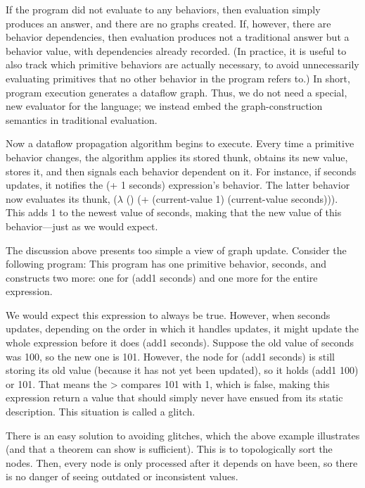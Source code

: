 If the program did not evaluate to any behaviors, then evaluation simply
produces an answer, and there are no graphs created. If, however, there are
behavior dependencies, then evaluation produces not a traditional answer but a
behavior value, with dependencies already recorded. (In practice, it is useful
to also track which primitive behaviors are actually necessary, to avoid
unnecessarily evaluating primitives that no other behavior in the program refers
to.) In short, program execution generates a dataflow graph. Thus, we do not
need a special, new evaluator for the language; we instead embed the
graph-construction semantics in traditional evaluation.

Now a dataflow propagation algorithm begins to execute. Every time a primitive
behavior changes, the algorithm applies its stored thunk, obtains its new value,
stores it, and then signals each behavior dependent on it. For instance, if
seconds updates, it notifies the (+ 1 seconds) expression’s behavior. The latter
behavior now evaluates its thunk, ($\lambda$ () (+ (current-value 1)
(current-value seconds))). This adds 1 to the newest value of seconds, making
that the new value of this behavior—just as we would expect.


The discussion above presents too simple a view of graph update. Consider the
following program:
This program has one primitive behavior, seconds, and constructs two more: one
for (add1 seconds) and one more for the entire expression.

We would expect this expression to always be true. However, when seconds
updates, depending on the order in which it handles updates, it might update the
whole expression before it does (add1 seconds). Suppose the old value of seconds
was 100, so the new one is 101. However, the node for (add1 seconds) is still
storing its old value (because it has not yet been updated), so it holds (add1
100) or 101. That means the > compares 101 with 1, which is false, making this
expression return a value that should simply never have ensued from its static
description. This situation is called a glitch.

There is an easy solution to avoiding glitches, which the above example
illustrates (and that a theorem can show is sufficient). This is to
topologically sort the nodes. Then, every node is only processed after it
depends on have been, so there is no danger of seeing outdated or inconsistent
values.

